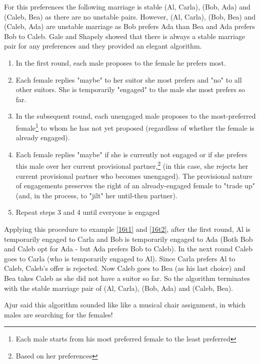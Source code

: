 For this preferences the following marriage is stable (Al, Carla), (Bob, Ada) and (Caleb, Bea) as there are no unstable pairs.
However, (Al, Carla), (Bob, Bea) and (Caleb, Ada) are unstable marriage as Bob prefers Ada than Bea and Ada prefers Bob to Caleb.
Gale and Shapely showed that there is always a stable marriage pair for any preferences and they provided an elegant algorithm.

\begin{enumerate}
    \item In the first round, each male proposes to the female he prefers most.
    \item Each female replies "maybe" to her suitor she most prefers and "no" to all other suitors. She is temporarily "engaged" to the male she most prefers so far. 
    \item In the subsequent round, each unengaged male proposes to the most-preferred female\footnote{Each male starts from his most preferred female to the least preferred} to whom he has not yet proposed (regardless of whether the female is already engaged).
    \item Each female replies "maybe" if she is currently not engaged or if she prefers this male over her current provisional partner,\footnote{Based on her preferences} (in this case, she rejects her current provisional partner who becomes unengaged). The provisional nature of engagements preserves the right of an already-engaged female to "trade up" (and, in the process, to "jilt" her until-then partner).
   \item Repeat steps 3 and 4 until everyone is engaged
\end{enumerate}

Applying this procedure to example \ref{16t1} and \ref{16t2}, after the first round, Al is temporarily engaged to Carla and Bob is temporarily engaged to Ada (Both Bob and Caleb opt for Ada - but Ada prefers Bob to Caleb). In the next round Caleb goes to Carla (who is temporarily engaged to Al). Since Carla prefers Al to Caleb, Caleb's offer is rejected. Now Caleb goes to Bea (as his last choice) and Bea takes Caleb as she did not have a suitor so far. So the algorithm terminates with the stable marriage pair of (Al, Carla), (Bob, Ada) and (Caleb, Bea). 

Ajur said this algorithm sounded like like a musical chair assignment, in which males are searching for the females!

